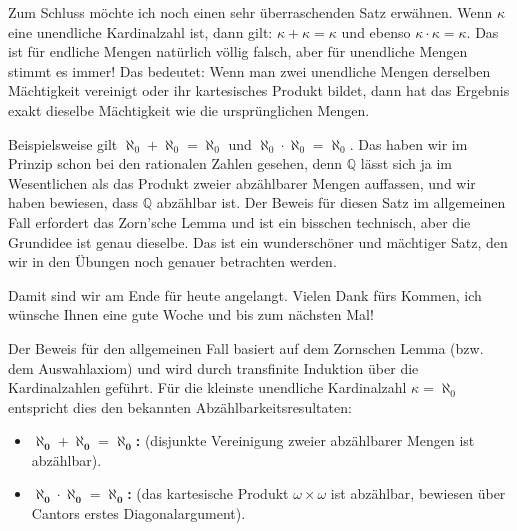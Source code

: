 \begin{spoken-clean}[01:20:55 - 01:23:00]
Zum Schluss möchte ich noch einen sehr überraschenden Satz erwähnen. Wenn $\kappa$ eine unendliche Kardinalzahl ist, dann gilt: $\kappa + \kappa = \kappa$ und ebenso $\kappa \cdot \kappa = \kappa$. Das ist für endliche Mengen natürlich völlig falsch, aber für unendliche Mengen stimmt es immer! Das bedeutet: Wenn man zwei unendliche Mengen derselben Mächtigkeit vereinigt oder ihr kartesisches Produkt bildet, dann hat das Ergebnis exakt dieselbe Mächtigkeit wie die ursprünglichen Mengen.
\end{spoken-clean}

\begin{spoken-clean}[01:23:00 - 01:25:21]
Beispielsweise gilt $\aleph_0 + \aleph_0 = \aleph_0$ und $\aleph_0 \cdot \aleph_0 = \aleph_0$. Das haben wir im Prinzip schon bei den rationalen Zahlen gesehen, denn $\mathbb{Q}$ lässt sich ja im Wesentlichen als das Produkt zweier abzählbarer Mengen auffassen, und wir haben bewiesen, dass $\mathbb{Q}$ abzählbar ist. Der Beweis für diesen Satz im allgemeinen Fall erfordert das Zorn'sche Lemma und ist ein bisschen technisch, aber die Grundidee ist genau dieselbe. Das ist ein wunderschöner und mächtiger Satz, den wir in den Übungen noch genauer betrachten werden.

Damit sind wir am Ende für heute angelangt. Vielen Dank fürs Kommen, ich wünsche Ihnen eine gute Woche und bis zum nächsten Mal!
\end{spoken-clean}

\begin{math-stroke}

\begin{explanation-of-steps}[Beweisidee]
Der Beweis für den allgemeinen Fall basiert auf dem Zornschen Lemma (bzw. dem Auswahlaxiom) und wird durch transfinite Induktion über die Kardinalzahlen geführt. Für die kleinste unendliche Kardinalzahl $\kappa = \aleph_0$ entspricht dies den bekannten Abzählbarkeitsresultaten:
\begin{itemize}
    \item \textbf{$\boldsymbol{\aleph_0 + \aleph_0 = \aleph_0}$:} (disjunkte Vereinigung zweier abzählbarer Mengen ist abzählbar).
    \item \textbf{$\boldsymbol{\aleph_0 \cdot \aleph_0 = \aleph_0}$:} (das kartesische Produkt $\omega \times \omega$ ist abzählbar, bewiesen über Cantors erstes Diagonalargument).
\end{itemize}
\end{explanation-of-steps}
\end{math-stroke}

